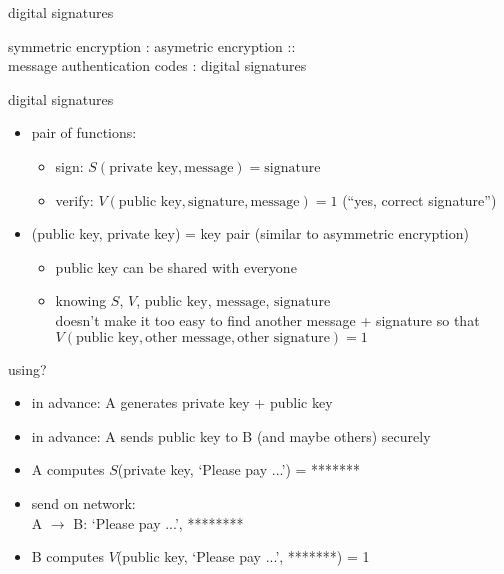 \begin{frame}{digital signatures}

symmetric encryption : asymetric encryption :: \\
message authentication codes : digital signatures
\end{frame}

\begin{frame}{digital signatures}
    \begin{itemize}
    \item pair of functions:
        \begin{itemize}
        \item sign: $S(\text{private key}, \text{message}) = \text{signature}$
        \item verify: $V(\text{public key}, \text{signature}, \text{message}) = 1$ (``yes, correct signature'') 
        \end{itemize}
    \item (public key, private key) = key pair (similar to asymmetric encryption)
        \begin{itemize}
        \item public key can be shared with everyone
        \item knowing $S$, $V$, $\text{public key}$, $\text{message}$, $\text{signature}$ \\
            doesn't make it too easy to find another message + signature so that\\
            $V(\text{public key}, \text{other message}, \text{other signature}) = 1$
        \end{itemize}
    \end{itemize}
\end{frame}

\begin{frame}{using?}
    \begin{itemize}
    \item in advance: A generates private key + public key
    \item in advance: A sends public key to B (and maybe others) securely
    \vspace{.5cm}
    \item A computes $S$(private key, `Please pay ...') = *******
    \item send on network: \\
    A $\rightarrow$ B: `Please pay ...', ********
    \item B computes $V$(public key, `Please pay ...', *******) = 1
    \end{itemize}
\end{frame}
